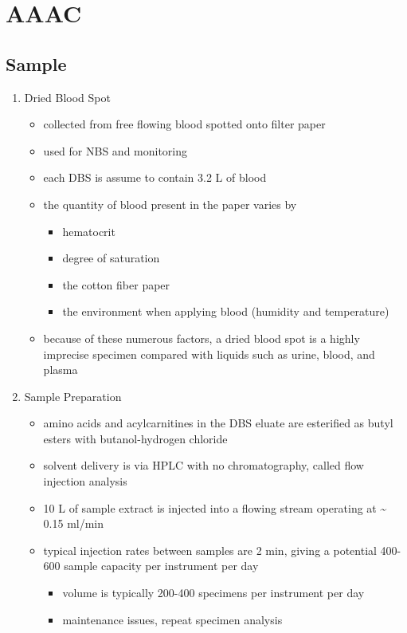 \documentclass{scrartcl}
\begin{document}
\section{AAAC}
\label{sec:orgd0ab7d9}
\subsection{Sample}
\label{sec:orgb169606}
\begin{enumerate}
\item Dried Blood Spot
\label{sec:orgec2980a}
\begin{itemize}
\item collected from free flowing blood spotted onto filter paper
\item used for NBS and monitoring
\item each DBS is assume to contain 3.2 \textmu{}L of blood
\item the quantity of blood present in the paper varies by
\begin{itemize}
\item hematocrit
\item degree of saturation
\item the cotton fiber paper
\item the environment  when applying blood (humidity and temperature)
\end{itemize}
\item because of these numerous factors, a dried blood spot is a highly
imprecise specimen compared with liquids such as urine, blood, and plasma
\end{itemize}

\item Sample Preparation
\label{sec:org091d8b3}
\begin{itemize}
\item amino acids and acylcarnitines in the DBS eluate are esterified as butyl esters with butanol-hydrogen chloride
\item solvent delivery is via HPLC with no chromatography, called flow injection analysis
\item 10 \textmu{}L of sample extract is injected into a flowing stream operating at \textasciitilde{} 0.15 ml/min

\item typical injection rates between samples are 2 min, giving a
potential 400-600 sample capacity per instrument per day
\begin{itemize}
\item volume is typically 200-400 specimens per instrument per day
\item maintenance issues, repeat specimen analysis
\end{itemize}
\end{itemize}


\end{enumerate}
\end{document}
